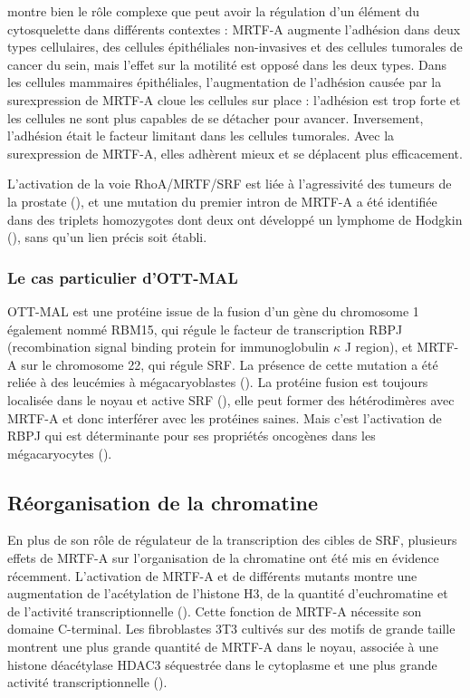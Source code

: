 \cite{leitner_mal/mrtf-controls_2011} montre bien le rôle complexe que peut avoir la régulation d'un élément du cytosquelette dans différents contextes : MRTF-A augmente l'adhésion dans deux types cellulaires, des cellules épithéliales non-invasives et des cellules tumorales de cancer du sein, mais l'effet sur la motilité est opposé dans les deux types. Dans les cellules mammaires épithéliales, l'augmentation de l'adhésion causée par la surexpression de MRTF-A cloue les cellules sur place : l'adhésion est trop forte et les cellules ne sont plus capables de se détacher pour avancer. Inversement, l'adhésion était le facteur limitant dans les cellules tumorales. Avec la surexpression de MRTF-A, elles adhèrent mieux et se déplacent plus efficacement. 

L'activation de la voie RhoA/MRTF/SRF est liée à l'agressivité des tumeurs de la prostate (\cite{schmidt_rhoa_2012}), et une mutation du premier intron de MRTF-A a été identifiée dans des triplets homozygotes dont deux ont développé un lymphome de Hodgkin (\cite{bjorkholm_development_2013}), sans qu'un lien précis soit établi. 

\subsubsection{Le cas particulier d'OTT-MAL}

OTT-MAL est une protéine issue de la fusion d'un gène du chromosome 1 également nommé RBM15, qui régule le facteur de transcription RBPJ (recombination signal binding protein for immunoglobulin $\kappa$ J region), et MRTF-A sur le chromosome 22, qui régule SRF. La présence de cette mutation a été reliée à des leucémies à mégacaryoblastes (\cite{mercher_involvement_2001}). 
La protéine fusion est toujours localisée dans le noyau et active SRF (\cite{descot_ott-mal_2008}), elle peut former des hétérodimères avec MRTF-A et donc interférer avec les protéines saines. Mais c'est l'activation de RBPJ qui est déterminante pour ses propriétés oncogènes dans les mégacaryocytes (\cite{mercher_ott-mal_2009}). 

\subsection{Réorganisation de la chromatine}

En plus de son rôle de régulateur de la transcription des cibles de SRF, plusieurs effets de MRTF-A sur l'organisation de la chromatine ont été mis en évidence récemment. L'activation de MRTF-A et de différents mutants montre une augmentation de l'acétylation de l'histone H3, de la quantité d'euchromatine et de l'activité transcriptionnelle (\cite{flouriot_actin/mkl1_2014}). Cette fonction de MRTF-A nécessite son domaine C-terminal. 
Les fibroblastes 3T3 cultivés sur des motifs de grande taille montrent une plus grande quantité de MRTF-A dans le noyau, associée à une histone déacétylase HDAC3 séquestrée dans le cytoplasme et une plus grande activité transcriptionnelle (\cite{jain_cell_2013}). 

